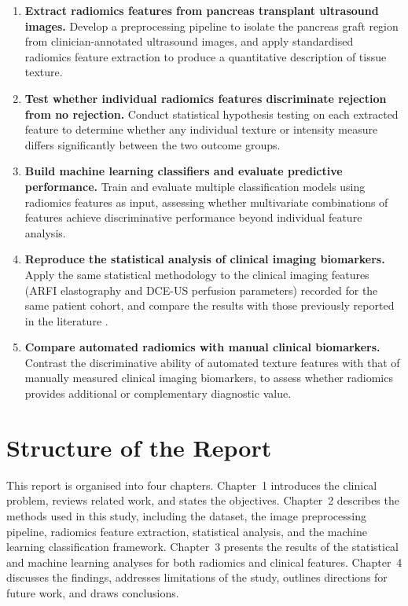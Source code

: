 \begin{enumerate}
\item \textbf{Extract radiomics features from pancreas transplant ultrasound images.} Develop a preprocessing pipeline to isolate the pancreas graft region from clinician-annotated ultrasound images, and apply standardised radiomics feature extraction to produce a quantitative description of tissue texture.

\item \textbf{Test whether individual radiomics features discriminate rejection from no rejection.} Conduct statistical hypothesis testing on each extracted feature to determine whether any individual texture or intensity measure differs significantly between the two outcome groups.

\item \textbf{Build machine learning classifiers and evaluate predictive performance.} Train and evaluate multiple classification models using radiomics features as input, assessing whether multivariate combinations of features achieve discriminative performance beyond individual feature analysis.

\item \textbf{Reproduce the statistical analysis of clinical imaging biomarkers.} Apply the same statistical methodology to the clinical imaging features (ARFI elastography and DCE-US perfusion parameters) recorded for the same patient cohort, and compare the results with those previously reported in the literature \cite{bassaganyas2025}.

\item \textbf{Compare automated radiomics with manual clinical biomarkers.} Contrast the discriminative ability of automated texture features with that of manually measured clinical imaging biomarkers, to assess whether radiomics provides additional or complementary diagnostic value.
\end{enumerate}

\section{Structure of the Report}

This report is organised into four chapters. Chapter~1 introduces the clinical problem, reviews related work, and states the objectives. Chapter~2 describes the methods used in this study, including the dataset, the image preprocessing pipeline, radiomics feature extraction, statistical analysis, and the machine learning classification framework. Chapter~3 presents the results of the statistical and machine learning analyses for both radiomics and clinical features. Chapter~4 discusses the findings, addresses limitations of the study, outlines directions for future work, and draws conclusions.

\newpage
